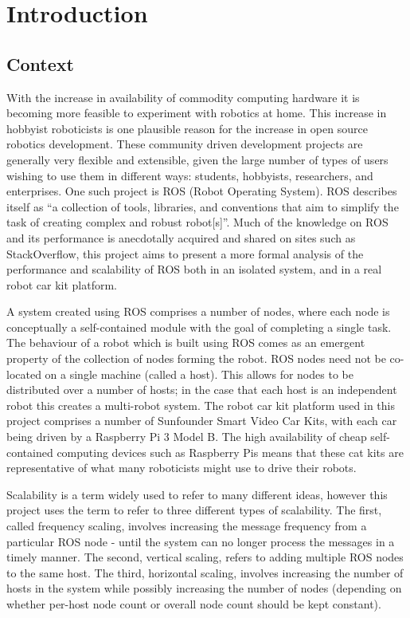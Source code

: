 \documentclass[../dissertation.tex]{subfiles}
\begin{document}
\chapter{Introduction}
\label{introduction-chapter}

\section{Context}

With the increase in availability of commodity computing hardware it is becoming more feasible to experiment with robotics at home. This increase in hobbyist roboticists is one plausible reason for the increase in open source robotics development. These community driven development projects are generally very flexible and extensible, given the large number of types of users wishing to use them in different ways: students, hobbyists, researchers, and enterprises. One such project is ROS (Robot Operating System). ROS describes itself as ``a collection of tools, libraries, and conventions that aim to simplify the task of creating complex and robust robot[s]''\cite{rosaboutpage}. Much of the knowledge on ROS and its performance is anecdotally acquired and shared on sites such as StackOverflow, this project aims to present a more formal analysis of the performance and scalability of ROS both in an isolated system, and in a real robot car kit platform.

A system created using ROS comprises a number of nodes, where each node is conceptually a self-contained module with the goal of completing a single task. The behaviour of a robot which is built using ROS comes as an emergent property of the collection of nodes forming the robot. ROS nodes need not be co-located on a single machine (called a host). This allows for nodes to be distributed over a number of hosts; in the case that each host is an independent robot this creates a multi-robot system. The robot car kit platform used in this project comprises a number of Sunfounder Smart Video Car Kits\cite{SunfounderRobotCarKit}, with each car being driven by a Raspberry Pi 3 Model B. The high availability of cheap self-contained computing devices such as Raspberry Pis means that these cat kits are representative of what many roboticists might use to drive their robots.

Scalability is a term widely used to refer to many different ideas, however this project uses the term to refer to three different types of scalability. The first, called frequency scaling, involves increasing the message frequency from a particular ROS node - until the system can no longer process the messages in a timely manner. The second, vertical scaling, refers to adding multiple ROS nodes to the same host. The third, horizontal scaling, involves increasing the number of hosts in the system while possibly increasing the number of nodes (depending on whether per-host node count or overall node count should be kept constant).
\end{document}
